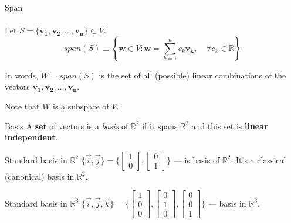 \documentclass[aspectratio=169,notes]{beamer}
\begin{document}
\begin{frame}[t]{Span}
    \framesubtitle{}
    Let $S=\{\mathbf{v_1,v_2,\ldots, v_n\}}\subset V$.
    \[
        span (S) \equiv
        \left\{ \mathbf{w} \in V: \mathbf{w}=\sum_{k=1}^n c_k \mathbf{v_k}, \quad
        \forall c_k\in \mathbb{R}\right\}
    \] \bigskip 

    
    In words, $W=span(S)$ is the set of all (possible) linear
    combinations of the vectors $\mathbf{v_1,v_2,\ldots, v_n}$.


    Note that $W$ is a subspace of $V$.

\end{frame}

\begin{frame}{Basis}
    \vspace*{-0.5cm}
    {A \textbf{set} of vectors is a \textit{basis} of $\mathbb{R}^2$} if it spans $\mathbb{R}^2$ and this set is \textbf{linear independent}.

    \begin{exampleblock}{Standard basis in $\mathbb{R}^2$}
        $\{{\vec{i}}, {\vec{j}}\} = \{\begin{bmatrix}
                1 \\ 0
            \end{bmatrix}, \begin{bmatrix}
                0 \\ 1
            \end{bmatrix}\}$ --- is basis of $\mathbb{R}^2$. It's a classical (canonical) basis in $\mathbb{R}^2$.
    \end{exampleblock}

    \begin{exampleblock}{Standard basis in $\mathbb{R}^3$}
        $\{{\vec{i}}, {\vec{j}}, {\vec{k}}\} = \{\begin{bmatrix} 1 \\ 0 \\ 0 \end{bmatrix}, \begin{bmatrix} 0 \\ 1 \\ 0 \end{bmatrix}, \begin{bmatrix} 0 \\ 0 \\ 1 \end{bmatrix}\}$ --- basis in $\mathbb{R}^3$.
    \end{exampleblock}
\end{frame}
\end{document}
